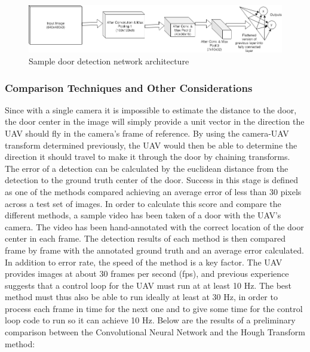 \documentclass[12pt]{article}
\begin{document}
\begin{figure}
	\centering
	\includegraphics[scale=0.5]{arch}
	\caption[Sample door detection network architecture]{Sample door detection network architecture}
	\vspace{10pt}
	\label{arch}
\end{figure}

\subsubsection{Comparison Techniques and Other Considerations}
Since with a single camera it is impossible to estimate the distance to the door, the door center in the image will simply provide a unit vector in the direction the UAV should fly in the camera's frame of reference. By using the camera-UAV transform determined previously, the UAV would then be able to determine the direction it should travel to make it through the door by chaining transforms. The error of a detection can be calculated by the euclidean distance from the detection to the ground truth center of the door. Success in this stage is defined as one of the methods compared achieving an average error of less than 30 pixels across a test set of images. In order to calculate this score and compare the different methods, a sample video has been taken of a door with the UAV's camera. The video has been hand-annotated with the correct location of the door center in each frame. The detection results of each method is then compared frame by frame with the annotated ground truth and an average error calculated. In addition to error rate, the speed of the method is a key factor. The UAV provides images at about 30 frames per second (fps), and previous experience suggests that a control loop for the UAV must run at at least 10 Hz. The best method must thus also be able to run ideally at least at 30 Hz, in order to process each frame in time for the next one and to give some time for the control loop code to run so it can achieve 10 Hz. Below are the results of a preliminary comparison between the Convolutional Neural Network and the Hough Transform method:
\end{document}
